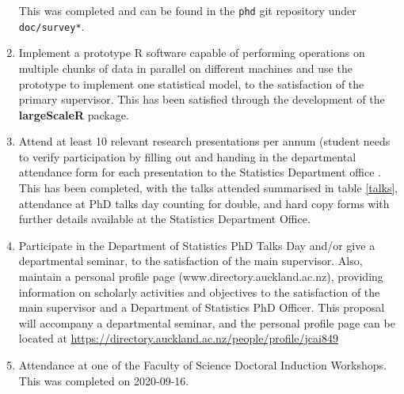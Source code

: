 \begin{enumerate}
                This was completed and can be found in the \texttt{phd} git repository under \texttt{doc/survey*}.
        \item Implement a prototype R software capable of performing operations on multiple chunks of data in parallel on different machines and use the prototype to implement one statistical model, to the satisfaction of the primary     supervisor.
                This has been satisfied through the development of the \textbf{largeScaleR} package.
        \item Attend at least 10 relevant research presentations per annum (student needs to verify participation by filling out and handing in the departmental attendance form for each presentation to the Statistics Department office    .
                This has been completed, with the talks attended summarised in table \ref{talks}, attendance at PhD talks day counting for double, and hard copy forms with further details available at the Statistics Department Office.
        \item Participate in the Department of Statistics PhD Talks Day and/or give a departmental seminar, to the satisfaction of the main supervisor.
                Also, maintain a personal profile page (www.directory.auckland.ac.nz), providing information on scholarly activities and objectives to the satisfaction of the main supervisor and a Department of Statistics PhD Officer.
                This proposal will accompany a departmental seminar, and the personal profile page can be located at \url{https://directory.auckland.ac.nz/people/profile/jcai849}
        \item Attendance at one of the Faculty of Science Doctoral Induction Workshops.
                This was completed  on 2020-09-16.
\end{enumerate}

